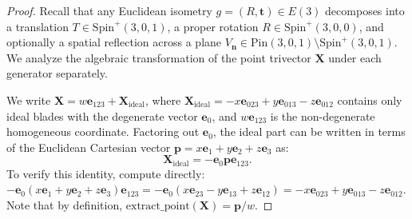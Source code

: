 \documentclass[10pt]{article}
\begin{document}
\begin{proof}
Recall that any Euclidean isometry $g = (R, \mathbf{t}) \in E(3)$ decomposes into a translation $T \in \mathrm{Spin}^+(3,0,1)$, a proper rotation $R \in \mathrm{Spin}^+(3,0,0)$, and optionally a spatial reflection across a plane $V_{\mathbf{n}} \in \mathrm{Pin}(3,0,1) \setminus \mathrm{Spin}^+(3,0,1)$. We analyze the algebraic transformation of the point trivector $\mathbf{X}$ under each generator separately.

We write $\mathbf{X} = w \mathbf{e}_{123} + \mathbf{X}_{\text{ideal}}$, where $\mathbf{X}_{\text{ideal}} = -x \mathbf{e}_{023} + y \mathbf{e}_{013} - z \mathbf{e}_{012}$ contains only ideal blades with the degenerate vector $\mathbf{e}_0$, and $w \mathbf{e}_{123}$ is the non-degenerate homogeneous coordinate. Factoring out $\mathbf{e}_0$, the ideal part can be written in terms of the Euclidean Cartesian vector $\mathbf{p} = x \mathbf{e}_1 + y \mathbf{e}_2 + z \mathbf{e}_3$ as:
\begin{equation}
    \mathbf{X}_{\text{ideal}} = -\mathbf{e}_0 \mathbf{p} \mathbf{e}_{123}.
\end{equation}
To verify this identity, compute directly: $-\mathbf{e}_0 (x \mathbf{e}_1 + y \mathbf{e}_2 + z \mathbf{e}_3) \mathbf{e}_{123} = -\mathbf{e}_0 (x \mathbf{e}_{23} - y \mathbf{e}_{13} + z \mathbf{e}_{12}) = -x \mathbf{e}_{023} + y \mathbf{e}_{013} - z \mathbf{e}_{012}$. Note that by definition, $\mathrm{extract\_point}(\mathbf{X}) = \mathbf{p}/w$.


\end{proof}
\end{document}

